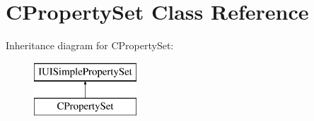 \hypertarget{class_c_property_set}{\section{C\-Property\-Set Class Reference}
\label{class_c_property_set}
}
Inheritance diagram for C\-Property\-Set\-:\begin{figure}[H]
\begin{center}
\leavevmode
\includegraphics[height=2.000000cm]{class_c_property_set}
\end{center}
\end{figure}
